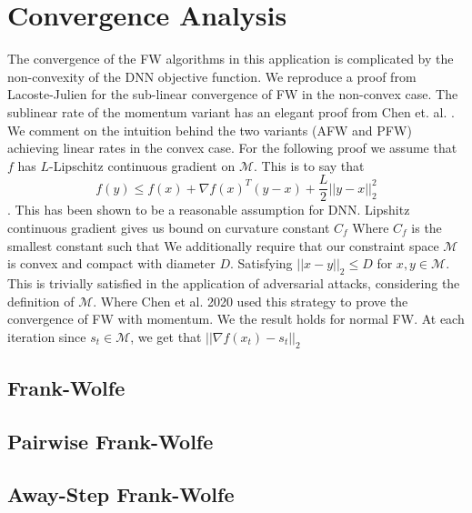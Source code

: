 \documentclass{article}
\begin{document}
\section{Convergence Analysis}
The convergence of the FW algorithms in this application is complicated by the non-convexity of the DNN objective function.
We reproduce a proof from Lacoste-Julien \cite{fw-noncovex} for the sub-linear convergence of FW in the non-convex case. The sublinear rate of the momentum variant has an elegant proof from Chen et. al. \cite{attacks}. We comment on the intuition behind the two variants (AFW and PFW) achieving linear rates in the convex case.
For the following proof we assume that $f$ has $L$-Lipschitz continuous gradient on $\mathcal{M}$. This is to say that 
$$ f(y) \leq f(x) + \nabla f(x)^T (y-x) + \frac{L}{2}||y-x||_2^2$$.
This has been shown to be a reasonable assumption for DNN. %
Lipshitz continuous gradient gives us bound on curvature constant $C_f$ %
Where $C_f$ is the smallest constant such that 
We additionally require that our constraint space $\mathcal{M}$ is convex and compact with diameter $D$. Satisfying $||x-y||_2 \leq D$ for $x,y \in \mathcal{M}$. This is trivially satisfied in the application of adversarial attacks, considering the definition of $\mathcal{M}$. 
Where Chen et al. 2020 used this strategy to prove the convergence of FW with momentum. We the result holds for normal FW. 
At each iteration since $s_t \in \mathcal{M}$, we get that $||\nabla f(x_t) - s_t||_2$

\subsection{Frank-Wolfe}
\subsection{Pairwise Frank-Wolfe}
\subsection{Away-Step Frank-Wolfe}


\end{document}
